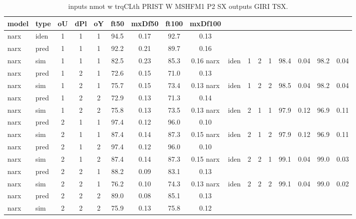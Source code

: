 \begin{center} 
\begin{longtable}{ll|ccc|cc|cc} 
\caption[inputs nmot w trqCLth PRIST W MSHFM1 P2 SX   outputs GIRI TSX]{inputs nmot w trqCLth PRIST W MSHFM1 P2 SX   outputs GIRI TSX.} 
\label{tab:inputs_nmot_w_trqCLth_PRIST_W_MSHFM1_P2_SX___outputs_GIRI_TSX} 
\hline 
  model & type & oU & dPl & oY & ft50 & mxDf50 & ft100 & mxDf100 \\ 
 \hline 
narx & iden & 1 & 1 & 1 & 94.5 & 0.17 & 92.7 & 0.13 \\ 
narx & pred & 1 & 1 & 1 & 92.2 & 0.21 & 89.7 & 0.16 \\ 
narx & sim  & 1 & 1 & 1 & 82.5 & 0.23 & 85.3 & 0.16 
 \hline 
narx & iden & 1 & 2 & 1 & 98.4 & 0.04 & 98.2 & 0.04 \\ 
narx & pred & 1 & 2 & 1 & 72.6 & 0.15 & 71.0 & 0.13 \\ 
narx & sim  & 1 & 2 & 1 & 75.7 & 0.15 & 73.4 & 0.13 
 \hline 
narx & iden & 1 & 2 & 2 & 98.5 & 0.04 & 98.2 & 0.04 \\ 
narx & pred & 1 & 2 & 2 & 72.9 & 0.13 & 71.3 & 0.14 \\ 
narx & sim  & 1 & 2 & 2 & 75.8 & 0.13 & 73.5 & 0.13 
 \hline 
narx & iden & 2 & 1 & 1 & 97.9 & 0.12 & 96.9 & 0.11 \\ 
narx & pred & 2 & 1 & 1 & 97.4 & 0.12 & 96.0 & 0.10 \\ 
narx & sim  & 2 & 1 & 1 & 87.4 & 0.14 & 87.3 & 0.15 
 \hline 
narx & iden & 2 & 1 & 2 & 97.9 & 0.12 & 96.9 & 0.11 \\ 
narx & pred & 2 & 1 & 2 & 97.4 & 0.12 & 96.0 & 0.10 \\ 
narx & sim  & 2 & 1 & 2 & 87.4 & 0.14 & 87.3 & 0.15 
 \hline 
narx & iden & 2 & 2 & 1 & 99.1 & 0.04 & 99.0 & 0.03 \\ 
narx & pred & 2 & 2 & 1 & 88.2 & 0.09 & 83.1 & 0.13 \\ 
narx & sim  & 2 & 2 & 1 & 76.2 & 0.10 & 74.3 & 0.13 
 \hline 
narx & iden & 2 & 2 & 2 & 99.1 & 0.04 & 99.0 & 0.02 \\ 
narx & pred & 2 & 2 & 2 & 89.0 & 0.08 & 85.1 & 0.13 \\ 
narx & sim  & 2 & 2 & 2 & 75.9 & 0.13 & 75.8 & 0.12 
 \hline 
\end{longtable} 
\end{center}